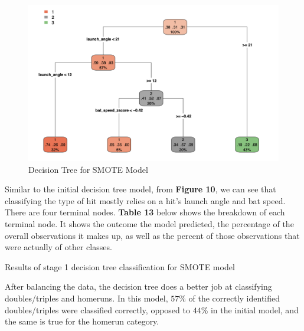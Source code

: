 \documentclass[
  letterpaper,
  DIV=11,
  numbers=noendperiod]{scrartcl}
\begin{document}
\begin{figure}[H]

{\centering \includegraphics{./images/figures/fig10.png}

}

\caption{Decision Tree for SMOTE Model}

\end{figure}%

Similar to the initial decision tree model, from \textbf{Figure 10}, we
can see that classifying the type of hit mostly relies on a hit's launch
angle and bat speed. There are four terminal nodes. \textbf{Table 13}
below shows the breakdown of each terminal node. It shows the outcome
the model predicted, the percentage of the overall observations it makes
up, as well as the percent of those observations that were actually of
other classes.

\begin{table}

\caption{\label{tbl-13}Results of stage 1 decision tree classification
for SMOTE model}


\end{table}%

After balancing the data, the decision tree does a better job at
classifying doubles/triples and homeruns. In this model, \(57\)\% of the
correctly identified doubles/triples were classified correctly, opposed
to \(44\)\% in the initial model, and the same is true for the homerun
category.
\end{document}
